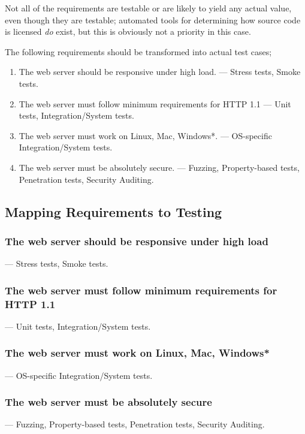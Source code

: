 Not all of the requirements are testable or are likely to yield any actual
value, even though they are testable; automated tools for determining how
source code is licensed \emph{do} exist, but this is obviously not a priority
in this case.

The following requirements should be transformed into actual test cases;
\begin{enumerate}
  \item The web server should be responsive under high load. --- Stress tests, Smoke tests.
  \item The web server must follow minimum requirements for HTTP 1.1 --- Unit tests, Integration/System tests.
  \item The web server must work on Linux, Mac, Windows*. --- OS-specific Integration/System tests.
  \item The web server must be absolutely secure. --- Fuzzing, Property-based tests, Penetration tests, Security Auditing.
\end{enumerate}


\subsection{Mapping Requirements to Testing}
\subsubsection{The web server should be responsive under high load}
--- Stress tests, Smoke tests.

\subsubsection{The web server must follow minimum requirements for HTTP 1.1}
--- Unit tests, Integration/System tests.

\subsubsection{The web server must work on Linux, Mac, Windows*}
--- OS-specific Integration/System tests.

\subsubsection{The web server must be absolutely secure}
--- Fuzzing, Property-based tests, Penetration tests, Security Auditing.

